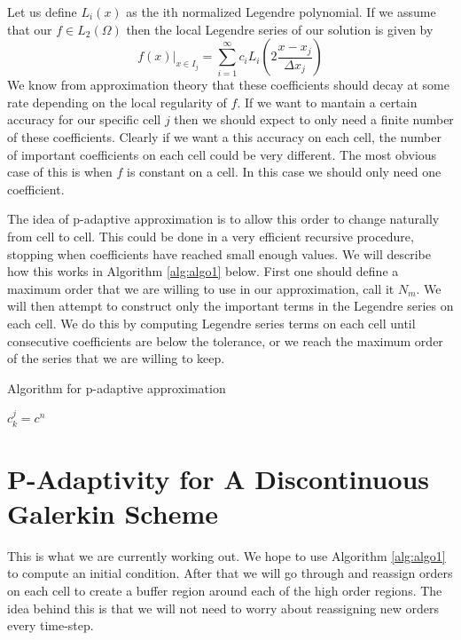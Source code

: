 \documentclass[10]{amsart}
\begin{document}
Let us define $L_i(x)$ as the ith normalized Legendre polynomial. If we assume that our $f \in L_2 (\Omega)$
then the local Legendre series of our solution is given by 
$$f(x)|_{x \in I_j}=\sum_{i=1}^\infty c_i L_i(2\frac{x-x_j}{\Delta x_j}) $$
We know from approximation theory that these coefficients should decay at some rate
depending on the local regularity of $f$. If we want to mantain a certain
accuracy for our specific cell $j$ then we should expect to only need a finite number of these coefficients.
Clearly if we want a this accuracy on each cell, the number of important coefficients on each cell
could be very different. The most obvious case of this is when $f$ is constant on a cell. In this case we should only
need one coefficient. 

The idea of p-adaptive approximation is to allow this order to change naturally from cell to cell. This could be done in a 
very efficient recursive procedure, stopping when coefficients have reached small enough values. 
We will describe how this works in Algorithm \ref{alg:algo1} below.
First one should define a maximum order that we are willing to use in our approximation, call it $N_m$. We will
then attempt to construct only the important terms in the Legendre series on each cell. We do this by computing Legendre
series terms on each cell until consecutive coefficients are below the tolerance, or we reach the maximum order
of the series that we are willing to keep. 

\begin{algorithm}
\caption{Algorithm for p-adaptive approximation}
\begin{algorithmic}[1]
    \State $c^j_k=c^n$
  \EndWhile
\EndFor
\end{algorithmic}\label{alg:algo1}
\end{algorithm}

\section{P-Adaptivity for A Discontinuous Galerkin Scheme}

This is what we are currently working out. We hope to use Algorithm \ref{alg:algo1} to
compute an initial condition. After that we will go through and reassign orders on each cell
to create a buffer region around each of the high order regions. The idea behind this is that we 
will not need to worry about reassigning new orders every time-step. 
\end{document}
